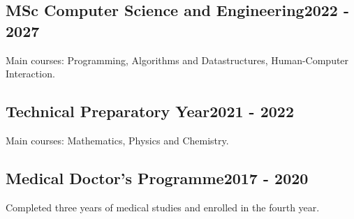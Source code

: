\vspace*{10pt}
\subsection {{MSc Computer Science and Engineering}\hfill 2022 - 2027}
\vspace*{5pt}
Main courses: Programming, Algorithms and Datastructures, Human-Computer Interaction.

\vspace*{6pt}
\subsection{{Technical Preparatory Year}\hfill 2021 - 2022}
\vspace*{5pt}
Main courses: Mathematics, Physics and Chemistry.

\vspace*{6pt}
\subsection{{Medical Doctor's Programme}\hfill 2017 - 2020}
\vspace*{5pt}
Completed three years of medical studies and enrolled in the fourth year.